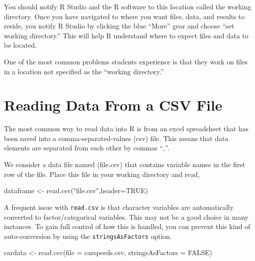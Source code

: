 \documentclass[
]{book}
\newenvironment{Shaded}{\begin{snugshade}}{\end{snugshade}}
\newcommand{\AttributeTok}[1]{\textcolor[rgb]{0.77,0.63,0.00}{#1}}
\newcommand{\ConstantTok}[1]{\textcolor[rgb]{0.00,0.00,0.00}{#1}}
\newcommand{\FunctionTok}[1]{\textcolor[rgb]{0.00,0.00,0.00}{#1}}
\newcommand{\NormalTok}[1]{#1}
\newcommand{\OtherTok}[1]{\textcolor[rgb]{0.56,0.35,0.01}{#1}}
\newcommand{\StringTok}[1]{\textcolor[rgb]{0.31,0.60,0.02}{#1}}
\begin{document}
You should notify R Studio and the R software to this location called the working directory. Once you have navigated to where you want files, data, and results to reside, you notify R Studio by clicking the blue ``More'' gear and choose ``set working directory.'' This will help R understand where to expect files and data to be located.

One of the most common problems students experience is that they work on files in a location not specified as the ``working directory.''

\hypertarget{reading-data-from-a-csv-file}{%
\section{Reading Data From a CSV File}\label{reading-data-from-a-csv-file}}

The most common way to read data into R is from an excel spreadsheet that has been saved into a comma-separated-values (csv) file. This means that data elements are separated from each other by commas ``,''.

We consider a data file named (file.csv) that contains variable names in the first row of the file. Place this file in your working directory and read,

\begin{Shaded}
\begin{Highlighting}[]
\NormalTok{dataframe }\OtherTok{\textless{}{-}} \FunctionTok{read.csv}\NormalTok{(}\StringTok{"file.csv"}\NormalTok{,}\AttributeTok{header=}\ConstantTok{TRUE}\NormalTok{)}
\end{Highlighting}
\end{Shaded}

A frequent issue with \texttt{read.csv} is that character variables are automatically converted to factor/categorical variables. This may not be a good choice in many instances. To gain full control of how this is handled, you can prevent this kind of auto-conversion by using the \texttt{stringsAsFactors} option.

\begin{Shaded}
\begin{Highlighting}[]
\NormalTok{cardata }\OtherTok{\textless{}{-}} \FunctionTok{read.csv}\NormalTok{(}\AttributeTok{file =} \StringTok{\textquotesingle{}carspeeds.csv\textquotesingle{}}\NormalTok{, }\AttributeTok{stringsAsFactors =} \ConstantTok{FALSE}\NormalTok{)}
\end{Highlighting}
\end{Shaded}
\end{document}
